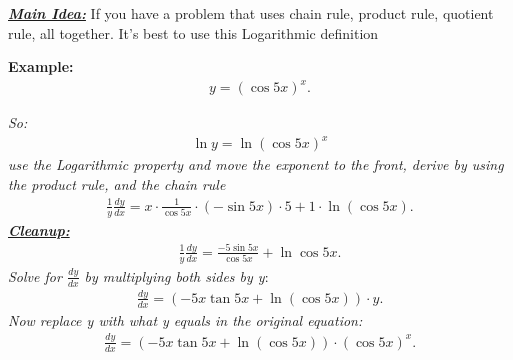 \documentclass{report}
\begin{document}
  \pagebreak \bigbreak \noindent
  \begin{mdframed}
    \textbf{\textit{\underline{Main Idea:}}}
    \bigbreak \noindent 
    If you have a problem that uses chain rule, product rule, quotient rule, all together. It's best to use this Logarithmic definition
  \end{mdframed}

  \bigbreak \noindent 
  \begin{mdframed}
    \textbf{Example:}
    \begin{align*}
      y = (\cos{5x})^{x}
    .\end{align*}
  \end{mdframed}

  \bigbreak \noindent 

  \bigbreak \noindent
  \textit{So:}
  \begin{align*}
    \ln{y} = \ln{(\cos{5x})^{x}} 
  \end{align*}
  \bigbreak \noindent 
  \textit{use the Logarithmic property and move the exponent to the front, derive by using the product rule, and the chain rule}
  \begin{align*}
    \frac{1}{y} \frac{dy}{dx} = x \cdot \frac{1}{\cos{5x}} \cdot (-\sin{5x}) \cdot 5 + 1 \cdot \ln{(\cos{5x})}  
  .\end{align*}
  \bigbreak \noindent 
  \textbf{\textit{\underline{Cleanup:}}}
  \begin{align*}
    \frac{1}{y}\frac{dy}{dx} = \frac{-5\sin{5x}}{\cos{5x}} + \ln{\cos{5x}} 
  .\end{align*}
  \bigbreak \noindent 
  \textit{Solve for $\frac{dy}{dx}$ by multiplying both sides by y}:
  \begin{align*}
    \frac{dy}{dx} = (-5x\tan{5x} + \ln{(\cos{5x})}) \cdot y
  .\end{align*}
  \bigbreak \noindent 
  \textit{Now replace y with what y equals in the original equation:}
  \begin{align*}
    \frac{dy}{dx} = (-5x\tan{5x} + \ln{(\cos{5x})}) \cdot (\cos{5x})^{x}
  .\end{align*}
\end{document}
